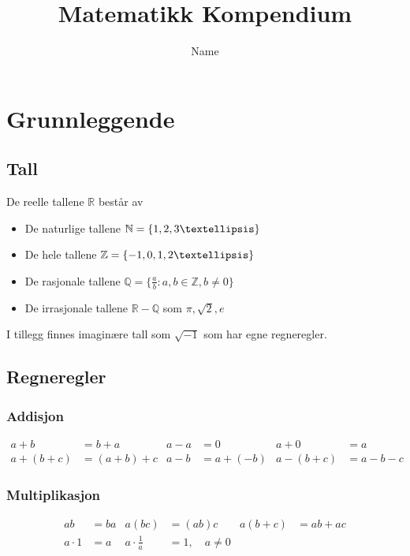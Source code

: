 \documentclass[12pt,norsk,a4paper]{article}
\title{Matematikk Kompendium}
\author{Name}
\begin{document}
\maketitle

\tableofcontents

\newpage

\section{Grunnleggende}
\subsection*{Tall}
De reelle tallene $\mathbb{R}$ består av

\begin{itemize}
\item De naturlige tallene $\mathbb{N} = \{ 1,2,3 \textellipsis \}$
\item De hele tallene $\mathbb{Z} = \{ -1,0,1,2 \textellipsis \}$
\item De rasjonale tallene $\mathbb{Q} = \{ \frac{a}{b} : a,b \in \mathbb{Z}, b \neq 0 \}$
\item De irrasjonale tallene $\mathbb{R} - \mathbb{Q}$ som $\pi,\sqrt{2},e$
\end{itemize}

I tillegg finnes imaginære tall som $\sqrt{-1}$ som har egne regneregler.

\newpage









\subsection{Regneregler}
\subsubsection*{Addisjon}
\begin{align*}
a + b &= b + a		&	a - a &= 0		&	a + 0 &= a	 	\\
a+(b+c) &= (a+b)+c	&	a - b &= a+(-b)	&	a-(b+c) &= a-b-c	
\end{align*}

\subsubsection*{Multiplikasjon}
\begin{align*}
ab &= ba		&	a(bc) &= (ab)c	&	a(b + c) &= ab + ac	\\
a \cdot 1 &= a	&	a \cdot \frac{1}{a} &= 1, \quad a \neq 0 
\end{align*}
\end{document}
